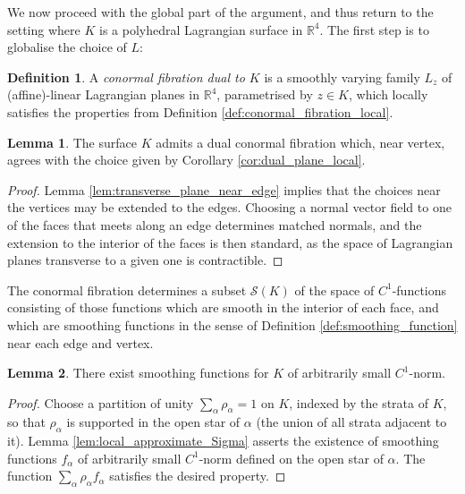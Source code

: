 \documentclass[11pt]{article}
\newcommand{\bR}{\mathbb{R}}
\newcommand{\scrS}{\mathscr{S}}
\theoremstyle{definition}
\newtheorem{definition}{Definition}
\newtheorem{lemma}{Lemma}
\begin{document}
We now proceed with the global part of the argument, and thus return to the setting where $K$ is a polyhedral Lagrangian surface in $\bR^4$. The first step is to globalise the choice of $L$:
 \begin{definition}
   A \emph{conormal fibration dual to $K$} is a smoothly varying family $L_z$ of (affine)-linear Lagrangian planes in $\bR^4$, parametrised by $z \in K$, which locally satisfies the properties from Definition \ref{def:conormal_fibration_local}. 
 \end{definition}
\begin{lemma}
The surface $K$ admits a dual conormal fibration which, near vertex, agrees with the choice given by Corollary \ref{cor:dual_plane_local}.
 \end{lemma}
 \begin{proof}
 Lemma \ref{lem:transverse_plane_near_edge} implies that the choices near the vertices may be extended to the edges. Choosing a normal vector field to one of the faces that meets along an edge determines matched normals, and the extension to the interior of the faces is then standard, as the space of Lagrangian planes transverse to a given one is contractible.
 \end{proof}
 The conormal fibration determines a subset $\scrS(K)$ of the space of $C^1$-functions consisting of those functions which are smooth in the interior of each face, and which are smoothing functions in the sense of Definition \ref{def:smoothing_function} near each edge and vertex.
 \begin{lemma} \label{lem:global_smoothing_function}
   There exist smoothing functions for $K$ of arbitrarily small $C^1$-norm.
 \end{lemma}
 \begin{proof}
Choose a partition of unity $\sum_\alpha \rho_{\alpha} =1 $ on $K$, indexed by the strata of $K$, so that $\rho_\alpha$ is supported in the open star of $\alpha$ (the union of all strata adjacent to it). Lemma \ref{lem:local_approximate_Sigma} asserts the existence of smoothing functions $f_\alpha$ of arbitrarily small $C^1$-norm defined on the open star of $\alpha$. The function $\sum_\alpha \rho_{\alpha} f_\alpha$ satisfies the desired property.  
\end{proof}
\end{document}
